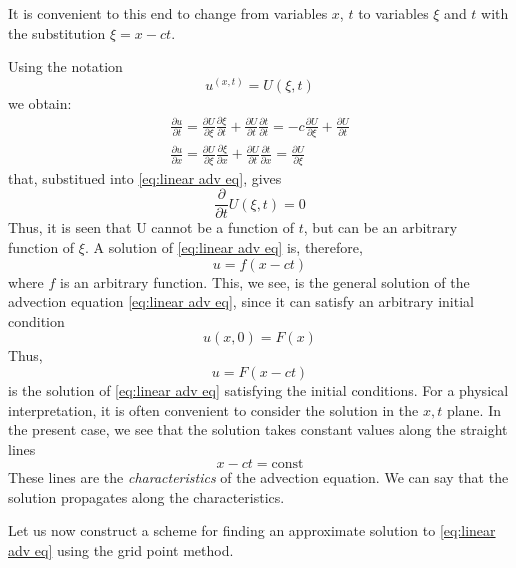 It is convenient to this end to change from variables $x$, $t$ to variables $\xi$ and $t$ with the substitution $\xi=x-ct$.

Using the notation
$$u^{(x,t)}=U(\xi,t)$$
we obtain:
\begin{align}
    \frac{\partial u}{\partial t}=\frac{\partial U}{\partial\xi}\frac{\partial\xi}{\partial t}+\frac{\partial U}{\partial t}\frac{\partial t}{\partial t}=-c\frac{\partial U}{\partial\xi}+\frac{\partial U}{\partial t}\\
    \frac{\partial u}{\partial x}=\frac{\partial U}{\partial\xi}\frac{\partial\xi}{\partial x}+\frac{\partial U}{\partial t}\frac{\partial t}{\partial x}=\frac{\partial U}{\partial\xi}
\end{align}
that, substitued into \ref{eq:linear adv eq}, gives
$$\frac{\partial}{\partial t}U(\xi, t)=0$$
Thus, it is seen that U cannot be a function of $t$, but can be an arbitrary function of $\xi$. A solution of \ref{eq:linear adv eq} is, therefore,
\begin{equation}\label{eq:sol of linear adv eq}
    u=f(x-ct)
\end{equation}
where $f$ is an arbitrary function. This, we see, is the general solution of the advection equation \ref{eq:linear adv eq}, since it can satisfy an arbitrary initial condition 
\begin{equation}
    u(x,0)=F(x)
\end{equation}
Thus, 
\begin{equation}
    u=F(x-ct)
\end{equation}
is the solution of \ref{eq:linear adv eq} satisfying the initial conditions. 
For a physical interpretation, it is often convenient to consider the solution in the $x, t$ plane. In the present case, we see that the solution takes constant values along the straight lines
$$x-ct= \text{const}$$
These lines are the \textit{characteristics} of the advection equa­tion. We can say that the solution propagates along the characteristics.

Let us now construct a scheme for finding an approxi­mate solution to \ref{eq:linear adv eq} using the grid point method.

